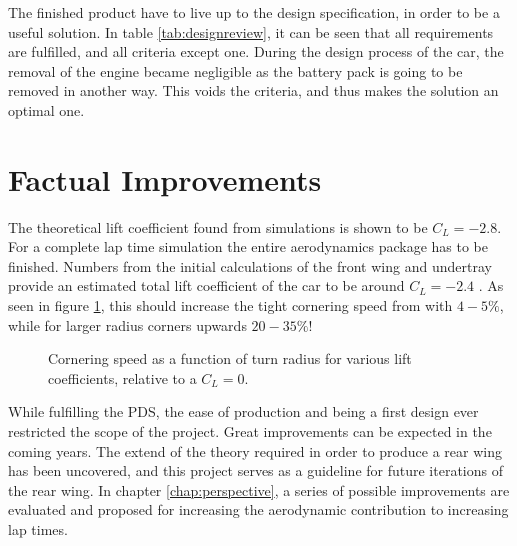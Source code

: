   The finished product have to live up to the design specification, in order to be a useful solution. In table \ref{tab:designreview}, it can be seen that all requirements are fulfilled, and all criteria except one. During the design process of the car, the removal of the engine became negligible as the battery pack is going to be removed in another way. This voids the criteria, and thus makes the solution an optimal one.

  \section{Factual Improvements}

  The theoretical lift coefficient found from simulations is shown to be $C_L = -2.8$. For a complete lap time simulation the entire aerodynamics package has to be finished. Numbers from the initial calculations of the front wing and undertray provide an estimated total lift coefficient of the car to be around $C_L = -2.4$ \cite{CLvalues}. As seen in figure \ref{fig:cornerspeedvsliftrelative}, this should increase the tight cornering speed from with $4-5\%$, while for larger radius corners upwards $20-35\%$!

  \begin{figure}
    \caption{Cornering speed as a function of turn radius for various lift coefficients, relative to a $C_L = 0$.}
    \label{fig:cornerspeedvsliftrelative}
  \end{figure}

  While fulfilling the PDS, the ease of production and being a first design ever restricted the scope of the project. Great improvements can be expected in the coming years. The extend of the theory required in order to produce a rear wing has been uncovered, and this project serves as a guideline for future iterations of the rear wing.  In chapter \ref{chap:perspective}, a series of possible improvements are evaluated and proposed for increasing the aerodynamic contribution to increasing lap times.
